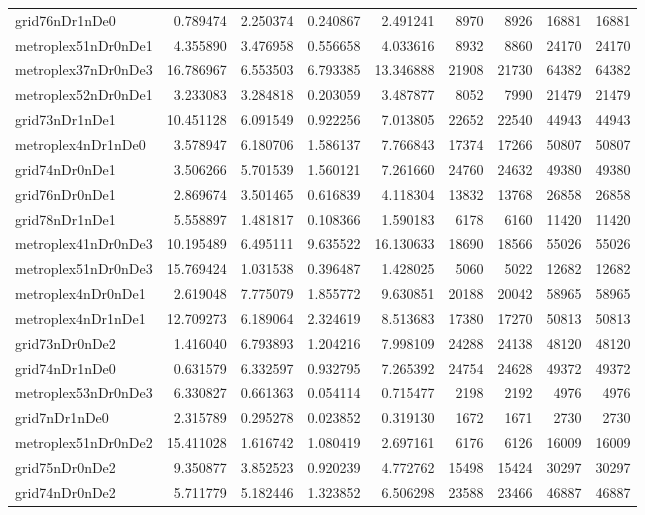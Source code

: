 \begin{longtable}{|l|r|r|r|r|r|r|r|r|}
grid76nDr1nDe0 & 0.789474 & 2.250374 & 0.240867 & 2.491241 & 8970 & 8926 & 16881 & 16881 \\
metroplex51nDr0nDe1 & 4.355890 & 3.476958 & 0.556658 & 4.033616 & 8932 & 8860 & 24170 & 24170 \\
metroplex37nDr0nDe3 & 16.786967 & 6.553503 & 6.793385 & 13.346888 & 21908 & 21730 & 64382 & 64382 \\
metroplex52nDr0nDe1 & 3.233083 & 3.284818 & 0.203059 & 3.487877 & 8052 & 7990 & 21479 & 21479 \\
grid73nDr1nDe1 & 10.451128 & 6.091549 & 0.922256 & 7.013805 & 22652 & 22540 & 44943 & 44943 \\
metroplex4nDr1nDe0 & 3.578947 & 6.180706 & 1.586137 & 7.766843 & 17374 & 17266 & 50807 & 50807 \\
grid74nDr0nDe1 & 3.506266 & 5.701539 & 1.560121 & 7.261660 & 24760 & 24632 & 49380 & 49380 \\
grid76nDr0nDe1 & 2.869674 & 3.501465 & 0.616839 & 4.118304 & 13832 & 13768 & 26858 & 26858 \\
grid78nDr1nDe1 & 5.558897 & 1.481817 & 0.108366 & 1.590183 & 6178 & 6160 & 11420 & 11420 \\
metroplex41nDr0nDe3 & 10.195489 & 6.495111 & 9.635522 & 16.130633 & 18690 & 18566 & 55026 & 55026 \\
metroplex51nDr0nDe3 & 15.769424 & 1.031538 & 0.396487 & 1.428025 & 5060 & 5022 & 12682 & 12682 \\
metroplex4nDr0nDe1 & 2.619048 & 7.775079 & 1.855772 & 9.630851 & 20188 & 20042 & 58965 & 58965 \\
metroplex4nDr1nDe1 & 12.709273 & 6.189064 & 2.324619 & 8.513683 & 17380 & 17270 & 50813 & 50813 \\
grid73nDr0nDe2 & 1.416040 & 6.793893 & 1.204216 & 7.998109 & 24288 & 24138 & 48120 & 48120 \\
grid74nDr1nDe0 & 0.631579 & 6.332597 & 0.932795 & 7.265392 & 24754 & 24628 & 49372 & 49372 \\
metroplex53nDr0nDe3 & 6.330827 & 0.661363 & 0.054114 & 0.715477 & 2198 & 2192 & 4976 & 4976 \\
grid7nDr1nDe0 & 2.315789 & 0.295278 & 0.023852 & 0.319130 & 1672 & 1671 & 2730 & 2730 \\
metroplex51nDr0nDe2 & 15.411028 & 1.616742 & 1.080419 & 2.697161 & 6176 & 6126 & 16009 & 16009 \\
grid75nDr0nDe2 & 9.350877 & 3.852523 & 0.920239 & 4.772762 & 15498 & 15424 & 30297 & 30297 \\
grid74nDr0nDe2 & 5.711779 & 5.182446 & 1.323852 & 6.506298 & 23588 & 23466 & 46887 & 46887 \\

\end{longtable}
